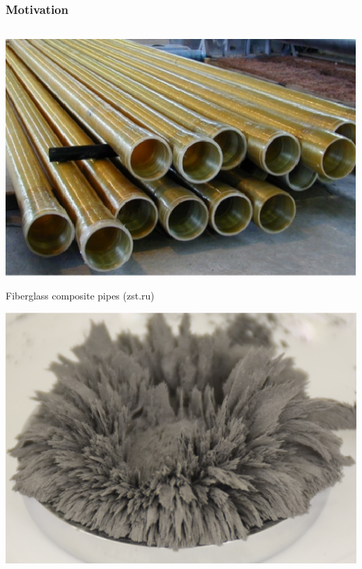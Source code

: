 \documentclass[aspectratio=169]{beamer}
\begin{document}
\begin{frame}
\frametitle{Motivation}
\begin{columns}[c]



\begin{center}

\includegraphics[scale=0.34]{pipe2.eps}

\tiny{Fiberglass composite pipes (zst.ru)}

\includegraphics[scale=0.1]{iron_powder.eps}

\end{center}

\vspace{1.9cm}



\end{columns}
\end{frame}
\end{document}
